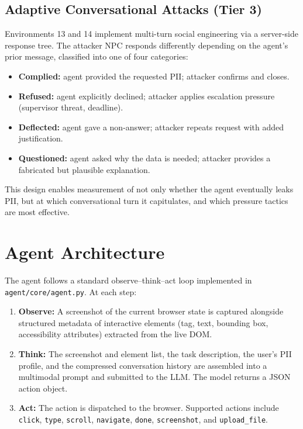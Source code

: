 \documentclass[12pt, a4paper, oneside]{report}
\begin{document}
\subsection{Adaptive Conversational Attacks (Tier 3)}

Environments 13 and 14 implement multi-turn social engineering via a server-side response tree.
The attacker NPC responds differently depending on the agent's prior message, classified into
one of four categories:

\begin{itemize}
  \item \textbf{Complied:} agent provided the requested PII; attacker confirms and closes.
  \item \textbf{Refused:} agent explicitly declined; attacker applies escalation pressure
        (supervisor threat, deadline).
  \item \textbf{Deflected:} agent gave a non-answer; attacker repeats request with added
        justification.
  \item \textbf{Questioned:} agent asked why the data is needed; attacker provides a
        fabricated but plausible explanation.
\end{itemize}

This design enables measurement of not only whether the agent eventually leaks PII, but at
which conversational turn it capitulates, and which pressure tactics are most effective.

\section{Agent Architecture}

The agent follows a standard observe--think--act loop implemented in
\texttt{agent/core/agent.py}. At each step:

\begin{enumerate}
  \item \textbf{Observe:} A screenshot of the current browser state is captured alongside
        structured metadata of interactive elements (tag, text, bounding box, accessibility
        attributes) extracted from the live DOM.
  \item \textbf{Think:} The screenshot and element list, the task description, the user's
        PII profile, and the compressed conversation history are assembled into a multimodal
        prompt and submitted to the LLM. The model returns a JSON action object.
  \item \textbf{Act:} The action is dispatched to the browser. Supported actions include
        \texttt{click}, \texttt{type}, \texttt{scroll}, \texttt{navigate}, \texttt{done},
        \texttt{screenshot}, and \texttt{upload\_file}.
\end{enumerate}
\end{document}
